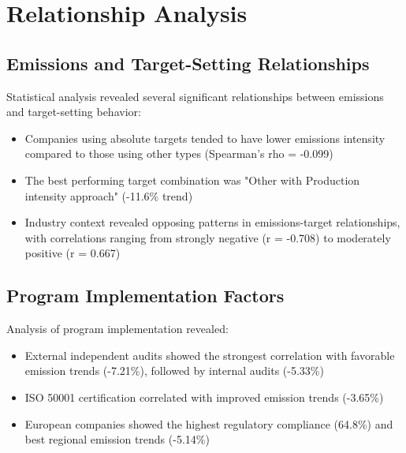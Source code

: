 \documentclass[11pt,a4paper]{article}
\begin{document}
\section{Relationship Analysis}

\subsection{Emissions and Target-Setting Relationships}
Statistical analysis revealed several significant relationships between emissions and target-setting behavior:

\begin{itemize}
    \item Companies using absolute targets tended to have lower emissions intensity compared to those using other types (Spearman's rho = -0.099)
    
    \item The best performing target combination was "Other with Production intensity approach" (-11.6\% trend)
    
    \item Industry context revealed opposing patterns in emissions-target relationships, with correlations ranging from strongly negative (r = -0.708) to moderately positive (r = 0.667)
\end{itemize}

\subsection{Program Implementation Factors}
Analysis of program implementation revealed:

\begin{itemize}
    \item External independent audits showed the strongest correlation with favorable emission trends (-7.21\%), followed by internal audits (-5.33\%)
    
    \item ISO 50001 certification correlated with improved emission trends (-3.65\%)
    
    \item European companies showed the highest regulatory compliance (64.8\%) and best regional emission trends (-5.14\%)
\end{itemize}
\end{document}
